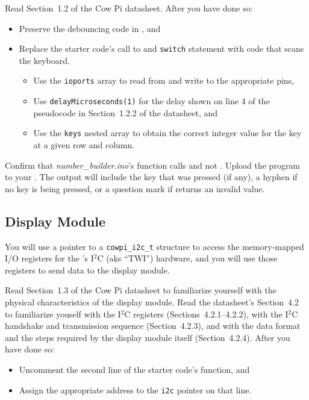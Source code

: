 Read Section~1.2 of the Cow Pi datasheet.
After you have done so:

\begin{itemize}
    \item Preserve the debouncing code in , and
    \item Replace the starter code's call to  and \lstinline{switch} statement with code that scans the keyboard.
        \begin{itemize}
            \item Use the \lstinline{ioports} array to read from and write to the appropriate pins,
            \item Use \lstinline{delayMicroseconds(1)} for the delay shown on line 4 of the pseudocode in Section~1.2.2 of the datasheet, and
            \item Use the \lstinline{keys} nested array to obtain the correct integer value for the key at a given row and column.
        \end{itemize}
\end{itemize}

Confirm that \textit{number\_builder.ino}'s  function calls  and not .
Upload the program to your \developmentboard.
The output will include the key that was pressed (if any), a hyphen if no key is being pressed, or a question mark if  returns an invalid value.


\subsection{Display Module}

You will use a pointer to a \lstinline{cowpi_i2c_t} structure to access the memory-mapped I/O registers for the \developmentboard's I$^2$C (aks ``TWI'') hardware,
and you will use those registers to send data to the display module.

Read Section~1.3 of the Cow Pi datasheet to familiarize yourself with the physical characteristics of the display module.
Read the datasheet's Section~4.2 to familiarize youself with the I$^2$C registers (Sections~4.2.1--4.2.2), with the I$^2$C handshake and transmission sequence (Section~4.2.3), and with the data format and the steps required by the display module itself (Section~4.2.4). After you have done so:

\begin{itemize}
    \item Uncomment the second line of the starter code's  function, and
    \item Assign the appropriate address to the \lstinline{i2c} pointer on that line.
\end{itemize}

